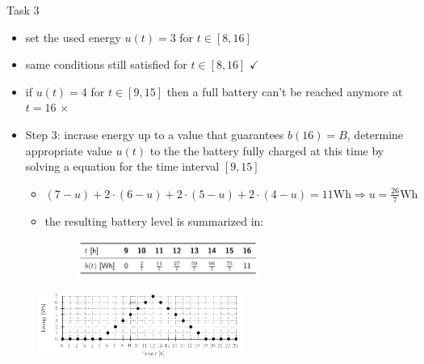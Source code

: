 \begin{frame}[allowframebreaks]{Task 3}{}
\begin{solutionnoinc}
\begin{itemize}
\begin{itemize}
\begin{itemize}
            \end{itemize}
          \item set the used energy $u(t) = 3$ for $t\in[8, 16]$
          \item same conditions still satisfied for $t\in [8, 16]$ $\checkmark$
          \item if $u(t)=4$ for $t\in[9, 15]$ then a full battery can't be reached anymore at $t=16$  $\times$
        \end{itemize}
      \end{itemize}
  \end{solutionnoinc}
  \begin{solutionnoinc}
    \begin{itemize}
      \item \alert{Step 3:} incrase energy up to a value that guarantees $b(16)=B$, determine appropriate value $u(t)$ to the the battery fully charged at this time by solving a equation for the time interval $[9, 15]$
      \begin{itemize}
        \item $(7-u)+2 \cdot(6-u)+2 \cdot(5-u)+2 \cdot(4-u)=11 \mathrm{Wh} \Rightarrow u=\frac{26}{7} \mathrm{Wh}$
        \item the resulting battery level is summarized in:
        \begin{figure}
          \centering
          \includegraphics[width=0.6\textwidth]{./figures/task3_table.png}
        \end{figure}
      \end{itemize}
    \end{itemize}
  \end{solutionnoinc}
  \framebreak
  \begin{solutionnoinc}
    \begin{figure}
      \centering
      \includegraphics[width=0.6\textwidth]{./figures/energyUsage_1_empty.png}
    \end{figure}
  \end{solutionnoinc}
  \begin{solutionnoinc}

\end{solutionnoinc}
\end{frame}
